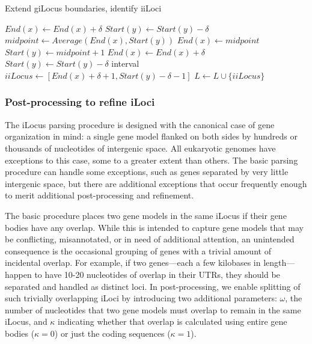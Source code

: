 \begin{algorithm}
\caption{Extend giLocus boundaries, identify iiLoci}
\label{Alg:ExtendIntervals}
\begin{algorithmic}[1]
    \State $\textit{End}(x) \gets \textit{End}(x) + \delta$
    \State $\textit{Start}(y) \gets \textit{Start}(y) - \delta$
    \State $\textit{midpoint} \gets \textit{Average}\left(\textit{End}(x), \textit{Start}(y)\right)$
    \State $\textit{End}(x) \gets \textit{midpoint}$
    \State $\textit{Start}(y) \gets \textit{midpoint} + 1$
\Else
    \State $\textit{End}(x) \gets \textit{End}(x) + \delta$
    \State $\textit{Start}(y) \gets \textit{Start}(y) - \delta$
    \State interval $iiLocus \gets [ \textit{End}(x)+\delta+1, \textit{Start}(y)-\delta-1 ]$
    \State $L \gets L \cup \{ iiLocus \}$
\EndIf
\EndFor
\EndProcedure
\end{algorithmic}
\end{algorithm}

\subsubsection*{Post-processing to refine iLoci}

The iLocus parsing procedure is designed with the canonical case of gene organization in mind: a single gene model flanked on both sides by hundreds or thousands of nucleotides of intergenic space.
All eukaryotic genomes have exceptions to this case, some to a greater extent than others.
The basic parsing procedure can handle some exceptions, such as genes separated by very little intergenic space, but there are additional exceptions that occur frequently enough to merit additional post-processing and refinement.

The basic procedure places two gene models in the same iLocus if their gene bodies have any overlap.
While this is intended to capture gene models that may be conflicting, misannotated, or in need of additional attention, an unintended consequence is the occasional grouping of genes with a trivial amount of incidental overlap.
For example, if two genes---each a few kilobases in length---happen to have 10-20 nucleotides of overlap in their UTRs, they should be separated and handled as distinct loci.
In post-processing, we enable splitting of such trivially overlapping iLoci by introducing two additional parameters: $\omega$, the number of nucleotides that two gene models must overlap to remain in the same iLocus, and $\kappa$ indicating whether that overlap is calculated using entire gene bodies ($\kappa = 0$) or just the coding sequences ($\kappa = 1$).

